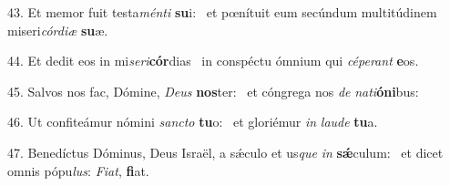 43. Et memor fuit testa\textit{mén}\textit{ti} \textbf{su}i: \ast\  et pœnítuit eum secúndum multitúdinem miseri\textit{cór}\textit{di}\textit{æ} \textbf{su}æ.\

44. Et dedit eos in mi\textit{se}\textit{ri}\textbf{cór}dias \ast\  in conspéctu ómnium qui \textit{cé}\textit{pe}\textit{rant} \textbf{e}os.\

45. Salvos nos fac, Dómine, \textit{De}\textit{us} \textbf{nos}ter: \ast\  et cóngrega nos \textit{de} \textit{na}\textit{ti}\textbf{ó}\textbf{ni}bus:\

46. Ut confiteámur nómini \textit{sanc}\textit{to} \textbf{tu}o: \ast\  et gloriémur \textit{in} \textit{lau}\textit{de} \textbf{tu}a.\

47. Benedíctus Dóminus, Deus Israël, a sǽculo et us\textit{que} \textit{in} \textbf{sǽ}culum: \ast\  et dicet omnis pópu\textit{lus}: \textit{Fi}\textit{at}, \textbf{fi}at.\

